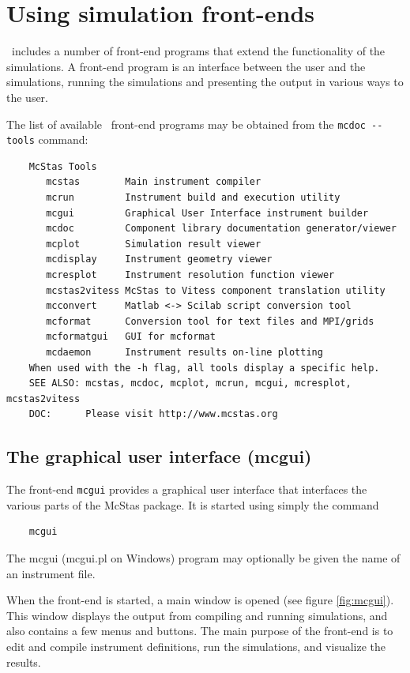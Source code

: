\section{Using simulation front-ends}
\label{s:frontends}

\MCS\ includes a number of front-end programs that extend the
functionality of the simulations. A front-end program is an interface
between the user and the simulations, running the simulations and
presenting the output in various ways to the user.

The list of available \MCS\ front-end programs may be obtained from the \verb+mcdoc --tools+ command:
\begin{verbatim}
    McStas Tools
       mcstas        Main instrument compiler
       mcrun         Instrument build and execution utility
       mcgui         Graphical User Interface instrument builder
       mcdoc         Component library documentation generator/viewer
       mcplot        Simulation result viewer
       mcdisplay     Instrument geometry viewer
       mcresplot     Instrument resolution function viewer
       mcstas2vitess McStas to Vitess component translation utility
       mcconvert     Matlab <-> Scilab script conversion tool
       mcformat      Conversion tool for text files and MPI/grids
       mcformatgui   GUI for mcformat
       mcdaemon      Instrument results on-line plotting
    When used with the -h flag, all tools display a specific help.
    SEE ALSO: mcstas, mcdoc, mcplot, mcrun, mcgui, mcresplot, mcstas2vitess
    DOC:      Please visit http://www.mcstas.org
\end{verbatim}

\subsection{The graphical user interface (mcgui)}
\label{s:mcgui}

The front-end \verb+mcgui+ provides a graphical user interface that
interfaces the various parts of the McStas package. It is started using
simply the command
\begin{verbatim}
    mcgui
\end{verbatim}
The mcgui (mcgui.pl on Windows) program may optionally be given the name of an instrument file.

When the front-end is started, a main window is opened (see figure \ref{fig:mcgui}). This window
displays the output from compiling and running simulations, and also
contains a few menus and buttons. The main purpose of the front-end is
to edit and compile instrument definitions, run the simulations, and
visualize the results.

